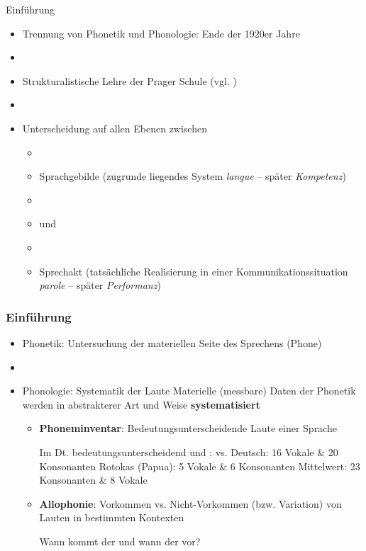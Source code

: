 \begin{frame}{Einführung}

\begin{itemize}
	\item Trennung von Phonetik und Phonologie: Ende der 1920er Jahre
	\item[]
	\item Strukturalistische Lehre der Prager Schule (vgl. \cite{Trubetzkoy89a})
	\item[]
	\item Unterscheidung auf allen Ebenen zwischen
	
	\begin{itemize}
		\item[]
		\item Sprachgebilde (zugrunde liegendes System \ras \textit{langue} -- später \textit{Kompetenz})
		\item[]
		\item[] und
		\item[]
		\item Sprechakt (tatsächliche Realisierung in einer Kommunikationssituation \textit{parole} -- später \textit{Performanz})
	\end{itemize}
	
\end{itemize}

\end{frame}




\begin{frame}
\frametitle{Einführung}

\begin{itemize}
	\item Phonetik: Untersuchung der materiellen Seite des Sprechens (Phone)
	\item[]
	\item Phonologie: Systematik der Laute \ras Materielle (messbare) Daten der Phonetik werden in abstrakterer Art und Weise \textbf{systematisiert}
	
	\begin{itemize}
		\item \textbf{Phoneminventar}: Bedeutungsunterscheidende Laute einer Sprache 

	\eal		
		\ex Im Dt. bedeutungsunterscheidend \textipa{[v]} und \textipa{[f]}: \textipa{[v\t{aI}n]} vs. \textipa{[f\t{aI}n]}
		\ex Deutsch: 16 Vokale \& 20 Konsonanten
		\ex Rotokas (Papua): 5 Vokale \& 6 Konsonanten
		\ex Mittelwert: 23 Konsonanten \& 8 Vokale
	\zl
	
		\item \textbf{Allophonie}: Vorkommen vs. Nicht-Vorkommen (bzw. Variation) von Lauten in bestimmten Kontexten

		\ea Wann kommt der  und wann der  vor?
		\z

	\end{itemize}
	
\end{itemize}
		
\end{frame}



